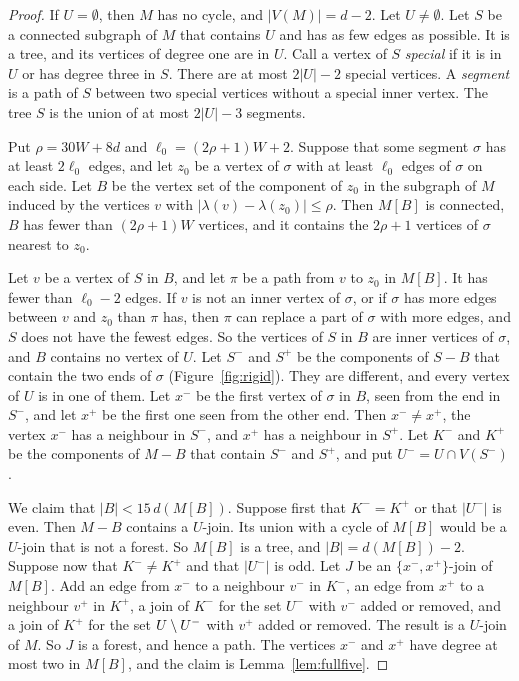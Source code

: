 \begin{proof}
If $U=\emptyset$, then $M$ has no cycle, and $|V(M)|=d-2$. Let $U\ne\emptyset$. Let $S$ be a
connected subgraph of $M$ that contains $U$ and has as few edges as possible. It is a tree, and
its vertices of degree one are in $U$. Call a vertex of $S$ \emph{special} if it is in $U$ or has
degree three in $S$. There are at most $2|U|-2$ special vertices. A \emph{segment} is a path of
$S$ between two special vertices without a special inner vertex. The tree $S$ is the union of at
most $2|U|-3$ segments.

Put $\rho=30W+8d$ and $\ell_0=(2\rho+1)W+2$. Suppose that some segment $\sigma$ has at least
$2\ell_0$ edges, and let $z_0$ be a vertex of $\sigma$ with at least $\ell_0$ edges of $\sigma$
on each side. Let $B$ be the vertex set of the component of $z_0$ in the subgraph of $M$ induced
by the vertices $v$ with $|\lambda(v)-\lambda(z_0)|\le\rho$. Then $M[B]$ is connected, $B$ has
fewer than $(2\rho+1)W$ vertices, and it contains the $2\rho+1$ vertices of $\sigma$ nearest to
$z_0$.

 Let $v$ be a vertex of $S$ in $B$, and let
$\pi$ be a path from $v$ to $z_0$ in $M[B]$. It has fewer than $\ell_0-2$ edges. If $v$ is not an
inner vertex of $\sigma$, or if $\sigma$ has more edges between $v$ and $z_0$ than $\pi$ has,
then $\pi$ can replace a part of $\sigma$ with more edges, and $S$ does not have the fewest
edges. So the vertices of $S$ in $B$ are inner vertices of $\sigma$, and $B$ contains no vertex
of $U$. Let $S^{-}$ and $S^{+}$ be the components of $S-B$ that contain the two ends of
$\sigma$ (Figure~\ref{fig:rigid}). They are different, and every vertex of $U$ is in one of them. Let $x^{-}$ be the first
vertex of $\sigma$ in $B$, seen from the end in $S^{-}$, and let $x^{+}$ be the first one seen
from the other end. Then $x^{-}\ne x^{+}$, the vertex $x^{-}$ has a neighbour in $S^{-}$, and
$x^{+}$ has a neighbour in $S^{+}$. Let $K^{-}$ and $K^{+}$ be the components of $M-B$ that
contain $S^{-}$ and $S^{+}$, and put $U^{-}=U\cap V(S^{-})$.

 We claim that $|B|<15\,d(M[B])$. Suppose first that $K^{-}=K^{+}$
or that $|U^{-}|$ is even. Then $M-B$ contains a $U$-join. Its union with a cycle of $M[B]$ would
be a $U$-join that is not a forest. So $M[B]$ is a tree, and $|B|=d(M[B])-2$. Suppose now that
$K^{-}\ne K^{+}$ and that $|U^{-}|$ is odd. Let $J$ be an $\{x^{-},x^{+}\}$-join of $M[B]$. Add
an edge from $x^{-}$ to a neighbour $v^{-}$ in $K^{-}$, an edge from $x^{+}$ to a neighbour
$v^{+}$ in $K^{+}$, a join of $K^{-}$ for the set $U^{-}$ with $v^{-}$ added or removed, and a
join of $K^{+}$ for the set $U\setminus U^{-}$ with $v^{+}$ added or removed. The result is a $U$-join
of $M$. So $J$ is a forest, and hence a path. The vertices $x^{-}$ and $x^{+}$ have degree at
most two in $M[B]$, and the claim is Lemma~\ref{lem:fullfive}.


\end{proof}

